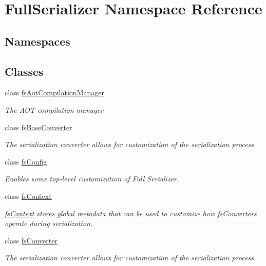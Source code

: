 \hypertarget{namespace_full_serializer}{}\section{Full\+Serializer Namespace Reference}
\label{namespace_full_serializer}
\subsection*{Namespaces}
\begin{DoxyCompactItemize}
\end{DoxyCompactItemize}
\subsection*{Classes}
\begin{DoxyCompactItemize}
\item 
class \hyperlink{class_full_serializer_1_1fs_aot_compilation_manager}{fs\+Aot\+Compilation\+Manager}
\begin{DoxyCompactList}\small\item\em The A\+OT compilation manager \end{DoxyCompactList}\item 
class \hyperlink{class_full_serializer_1_1fs_base_converter}{fs\+Base\+Converter}
\begin{DoxyCompactList}\small\item\em The serialization converter allows for customization of the serialization process. \end{DoxyCompactList}\item 
class \hyperlink{class_full_serializer_1_1fs_config}{fs\+Config}
\begin{DoxyCompactList}\small\item\em Enables some top-\/level customization of Full Serializer. \end{DoxyCompactList}\item 
class \hyperlink{class_full_serializer_1_1fs_context}{fs\+Context}
\begin{DoxyCompactList}\small\item\em \hyperlink{class_full_serializer_1_1fs_context}{fs\+Context} stores global metadata that can be used to customize how fs\+Converters operate during serialization. \end{DoxyCompactList}\item 
class \hyperlink{class_full_serializer_1_1fs_converter}{fs\+Converter}
\begin{DoxyCompactList}\small\item\em The serialization converter allows for customization of the serialization process. \end{DoxyCompactList}\item 

\end{DoxyCompactItemize}
